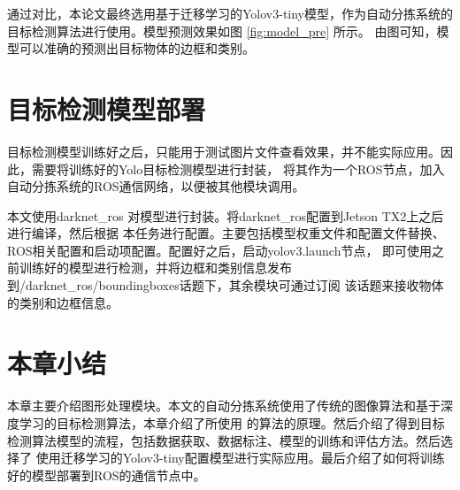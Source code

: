 通过对比，本论文最终选用基于迁移学习的Yolov3-tiny模型，作为自动分拣系统的目标检测算法进行使用。模型预测效果如图 \ref{fig:model_pre} 所示。
由图可知，模型可以准确的预测出目标物体的边框和类别。

\section{目标检测模型部署}

目标检测模型训练好之后，只能用于测试图片文件查看效果，并不能实际应用。因此，需要将训练好的Yolo目标检测模型进行封装，
将其作为一个ROS节点，加入自动分拣系统的ROS通信网络，以便被其他模块调用。

本文使用darknet\_ros \cite{darknet_ros}对模型进行封装。将darknet\_ros配置到Jetson TX2上之后进行编译，然后根据
本任务进行配置。主要包括模型权重文件和配置文件替换、ROS相关配置和启动项配置。配置好之后，启动yolov3.launch节点，
即可使用之前训练好的模型进行检测，并将边框和类别信息发布到/darknet\_ros/boundingboxes话题下，其余模块可通过订阅
该话题来接收物体的类别和边框信息。

\section{本章小结}
本章主要介绍图形处理模块。本文的自动分拣系统使用了传统的图像算法和基于深度学习的目标检测算法，本章介绍了所使用
的算法的原理。然后介绍了得到目标检测算法模型的流程，包括数据获取、数据标注、模型的训练和评估方法。然后选择了
使用迁移学习的Yolov3-tiny配置模型进行实际应用。最后介绍了如何将训练好的模型部署到ROS的通信节点中。